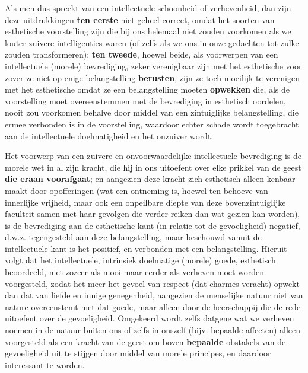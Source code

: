 Als men dus spreekt van een intellectuele schoonheid of verhevenheid, dan zijn deze uitdrukkingen \textbf{ten eerste} niet geheel correct, omdat het soorten van esthetische voorstelling zijn die bij ons helemaal niet zouden voorkomen als we louter zuivere intelligenties waren (of zelfs als we ons in onze gedachten tot zulke zouden transformeren); \textbf{ten tweede}, hoewel beide, als voorwerpen van een intellectuele (morele) bevrediging, zeker verenigbaar zijn met het esthetische voor zover ze niet op enige belangstelling \textbf{berusten}, zijn ze toch moeilijk te verenigen met het esthetische omdat ze een belangstelling moeten \textbf{opwekken} die, als de voorstelling moet overeenstemmen met de bevrediging in esthetisch oordelen, nooit zou voorkomen behalve door middel van een zintuiglijke belangstelling, die ermee verbonden is in de voorstelling, waardoor echter schade wordt toegebracht aan de intellectuele doelmatigheid en het onzuiver wordt.

Het voorwerp van een zuivere en onvoorwaardelijke intellectuele bevrediging is de morele wet in al zijn kracht, die hij in ons uitoefent over elke prikkel van de geest \textbf{die eraan voorafgaat}; en aangezien deze kracht zich esthetisch alleen kenbaar maakt door opofferingen (wat een ontneming is, hoewel ten behoeve van innerlijke vrijheid, maar ook een onpeilbare diepte van deze bovenzintuiglijke faculteit samen met haar gevolgen die verder reiken dan wat gezien kan worden), is de bevrediging aan de esthetische kant (in relatie tot de gevoeligheid) negatief, d.w.z. tegengesteld aan deze belangstelling, maar beschouwd vanuit de intellectuele kant is het positief, en verbonden met een belangstelling. Hieruit volgt dat het intellectuele, intrinsiek doelmatige (morele) goede, esthetisch beoordeeld, niet zozeer als mooi maar eerder als verheven moet worden voorgesteld, zodat het meer het gevoel van respect (dat charmes veracht) opwekt dan dat van liefde en innige genegenheid, aangezien de menselijke natuur niet van nature overeenstemt met dat goede, maar alleen door de heerschappij die de rede uitoefent over de gevoeligheid. Omgekeerd wordt zelfs datgene wat we verheven noemen in de natuur buiten ons of zelfs in onszelf (bijv. bepaalde affecten) alleen voorgesteld als een kracht van de geest om boven \textbf{bepaalde} obstakels van de gevoeligheid uit te stijgen door middel van morele principes, en daardoor interessant te worden.

